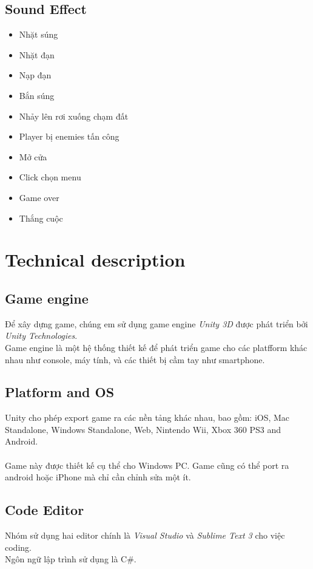 \documentclass[14pt,a4paper]{extreport}
\begin{document}
\section{Sound Effect}
\begin{itemize}
	\item Nhặt súng
	\item Nhặt đạn
	\item Nạp đạn
	\item Bắn súng
	\item Nhảy lên rơi xuống chạm đất
	\item Player bị enemies tấn công
	\item Mở cửa
	\item Click chọn menu
	\item Game over
	\item Thắng cuộc
\end{itemize}


\chapter{Technical description}
\section{Game engine}
 Để xây dựng game, chúng em sử dụng game engine \textit{Unity 3D} được phát triển bởi \textit{Unity Technologies}. \\
 Game engine là một hệ thống thiết kế để phát triển game cho các platfform khác nhau như console, máy tính, và các thiết bị cầm tay như smartphone.
 

\section{Platform and OS}
Unity cho phép export game ra các nền tảng khác nhau, bao gồm: iOS, Mac
Standalone, Windows Standalone, Web, Nintendo Wii, Xbox 360 PS3 and Android.
\\
\\
Game này được thiết kế cụ thể cho Windows PC. Game cũng có thể port ra android hoặc iPhone mà chỉ cần chỉnh sửa một ít.

\section{Code Editor}
Nhóm sử dụng hai editor chính là \textit{Visual Studio} và \textit{Sublime Text 3} cho việc coding. \\
Ngôn ngữ lập trình sử dụng là C\#.
\end{document}
